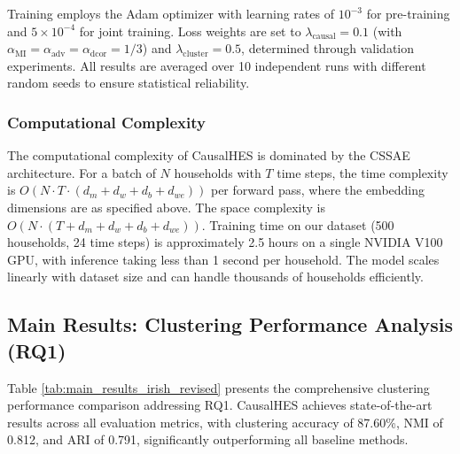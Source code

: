 \documentclass[journal]{IEEEtran}
\begin{document}
Training employs the Adam optimizer with learning rates of $10^{-3}$ for pre-training and $5 \times 10^{-4}$ for joint training. Loss weights are set to $\lambda_{\text{causal}}=0.1$ (with $\alpha_{\text{MI}}=\alpha_{\text{adv}}=\alpha_{\text{dcor}}=1/3$) and $\lambda_{\text{cluster}}=0.5$, determined through validation experiments. All results are averaged over 10 independent runs with different random seeds to ensure statistical reliability.

\subsubsection{Computational Complexity}
The computational complexity of CausalHES is dominated by the CSSAE architecture. For a batch of $N$ households with $T$ time steps, the time complexity is $O(N \cdot T \cdot (d_m + d_w + d_b + d_{we}))$ per forward pass, where the embedding dimensions are as specified above. The space complexity is $O(N \cdot (T + d_m + d_w + d_b + d_{we}))$. Training time on our dataset (500 households, 24 time steps) is approximately 2.5 hours on a single NVIDIA V100 GPU, with inference taking less than 1 second per household. The model scales linearly with dataset size and can handle thousands of households efficiently.

\subsection{Main Results: Clustering Performance Analysis (RQ1)}
\label{sec:clustering_performance_results}

Table \ref{tab:main_results_irish_revised} presents the comprehensive clustering performance comparison addressing RQ1. CausalHES achieves state-of-the-art results across all evaluation metrics, with clustering accuracy of 87.60\%, NMI of 0.812, and ARI of 0.791, significantly outperforming all baseline methods.
\end{document}
